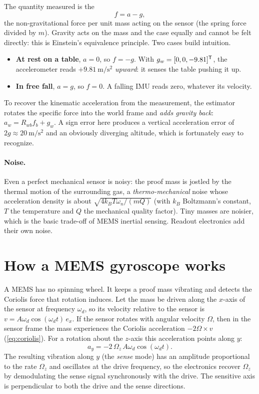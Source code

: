 The quantity measured is the 
\begin{equation}
  f = a - g,
\end{equation}
the non-gravitational force per unit mass acting on the sensor (the spring force divided by $m$). Gravity acts on the mass and the case equally
and cannot be felt directly: this is Einstein's equivalence principle. Two cases build intuition.
\begin{itemize}
  \item \textbf{At rest on a table}, $a = 0$, so $f = -g$. With $g_w = [0, 0, -9.81]^{\mathsf{T}}$, the accelerometer reads $+9.81~\mathrm{m/s^2}$ \emph{upward}: it senses the table
        pushing it up.
  \item \textbf{In free fall}, $a = g$, so $f = 0$. A falling IMU reads zero, whatever its velocity.
\end{itemize}
To recover the kinematic acceleration from the measurement, the estimator rotates the specific force into the world frame and \emph{adds gravity back}:
$a_w = R_{wb}f_b + g_w$. A sign error here produces a vertical acceleration error of $2g \approx 20~\mathrm{m/s^2}$ and an obviously diverging altitude, which is
fortunately easy to recognize.

\paragraph{Noise.} Even a perfect mechanical sensor is noisy: the proof mass is jostled by the thermal motion of the surrounding gas, a
\emph{thermo-mechanical} noise whose acceleration density is about $\sqrt{4k_BT\omega_n/(mQ)}$ (with $k_B$ Boltzmann's constant, $T$ the temperature and $Q$ the
mechanical quality factor). Tiny masses are noisier, which is the basic trade-off of MEMS inertial sensing. Readout electronics add their own noise.

\section{How a MEMS gyroscope works}

A MEMS  has no spinning wheel. It keeps a proof mass vibrating and detects the Coriolis force that rotation induces. Let the mass be
driven along the $x$-axis of the sensor at frequency $\omega_d$, so its velocity relative to the sensor is $v = A\omega_d\cos(\omega_dt)\,e_x$. If the sensor
rotates with angular velocity $\Omega$, then in the sensor frame the mass experiences the Coriolis acceleration $-2\Omega\times v$ (\cref{eq:coriolis}).
For a rotation about the $z$-axis this acceleration points along $y$:
\begin{equation}
  a_y = -2\,\Omega_z\,A\omega_d\cos(\omega_dt) .
  \label{eq:gyro-coriolis}
\end{equation}
The resulting vibration along $y$ (the \emph{sense} mode) has an amplitude proportional to the rate $\Omega_z$ and oscillates at the drive frequency, so
the electronics recover $\Omega_z$ by demodulating the sense signal synchronously with the drive. The sensitive axis is perpendicular to both the drive and
the sense directions.

